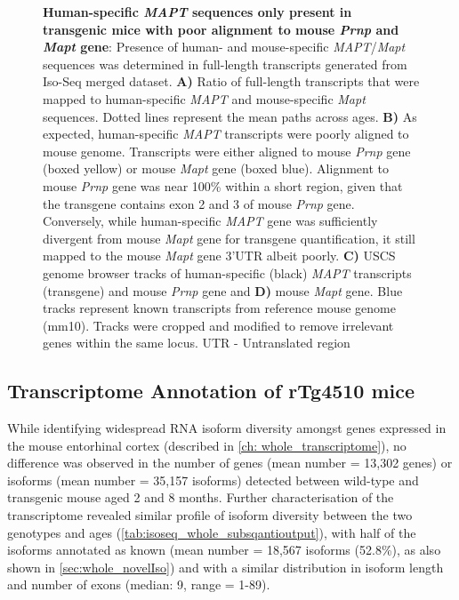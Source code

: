 \begin{figure}[htp]
	{\textbf{Human-specific \textit{MAPT} sequences only present in transgenic mice with poor alignment to mouse \textit{Prnp} and \textit{Mapt} gene}: Presence of human- and mouse-specific \textit{MAPT}/\textit{Mapt} sequences was determined in full-length transcripts generated from Iso-Seq merged dataset. \textbf{A)} Ratio of full-length transcripts that were mapped to human-specific \textit{MAPT} and mouse-specific \textit{Mapt} sequences. Dotted lines represent the mean paths across ages. \textbf{B)} As expected, human-specific \textit{MAPT} transcripts were poorly aligned to mouse genome. Transcripts were either aligned to mouse \textit{Prnp} gene (boxed yellow) or  mouse \textit{Mapt} gene (boxed blue). Alignment to mouse \textit{Prnp} gene was near 100\% within a short region, given that the transgene contains exon 2 and 3 of mouse \textit{Prnp} gene\cite{Ramsden2005}. Conversely, while human-specific \textit{MAPT} gene was sufficiently divergent from mouse \textit{Mapt} gene for transgene quantification, it still mapped to the mouse \textit{Mapt} gene 3'UTR albeit poorly. \textbf{C)} USCS genome browser tracks of human-specific (black) \textit{MAPT} transcripts (transgene) and mouse \textit{Prnp} gene and \textbf{D)} mouse \textit{Mapt} gene. Blue tracks represent known transcripts from reference mouse genome (mm10). Tracks were cropped and modified to remove irrelevant genes within the same locus.  UTR - Untranslated region}
	\label{fig:isoseq_humanmapt}
\end{figure}


\subsection{Transcriptome Annotation of rTg4510 mice}
While identifying widespread RNA isoform diversity amongst genes expressed in the mouse entorhinal cortex (described in \cref{ch: whole_transcriptome}), no difference was observed in the number of genes (mean number = 13,302 genes) or isoforms (mean number = 35,157 isoforms) detected between wild-type and transgenic mouse aged 2 and 8 months. Further characterisation of the transcriptome revealed similar profile of isoform diversity between the two genotypes and ages (\cref{tab:isoseq_whole_subsqantioutput}), with half of the isoforms annotated as known (mean number = 18,567 isoforms (52.8\%), as also shown in \cref{sec:whole_novelIso}) and with a similar distribution in isoform length and number of exons (median: 9, range = 1-89). 

